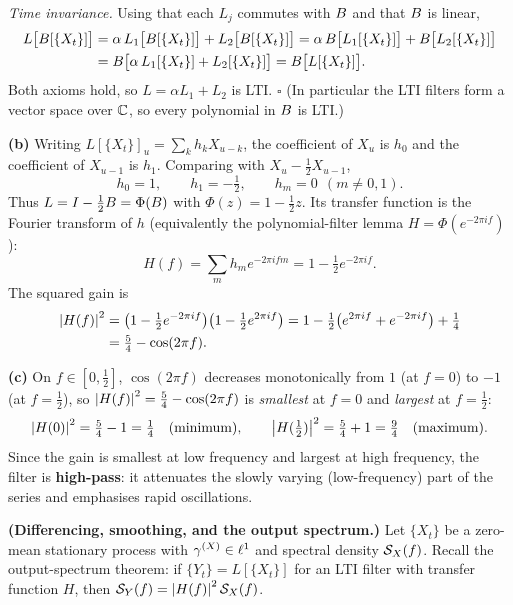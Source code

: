 \documentclass[11pt]{article}
\newcommand{\filt}{L}
\begin{document}
\emph{Time invariance.} Using that each $\filt_j$ commutes with $B$ and that $B$ is linear,
\[
\begin{aligned}
\filt\bigl[\Bsh[\{X_t\}]\bigr]
&=\alpha\,\filt_1\bigl[\Bsh[\{X_t\}]\bigr]+\filt_2\bigl[\Bsh[\{X_t\}]\bigr]
 =\alpha\,\Bsh\bigl[\filt_1[\{X_t\}]\bigr]+\Bsh\bigl[\filt_2[\{X_t\}]\bigr]\\
&=\Bsh\bigl[\alpha\,\filt_1[\{X_t\}]+\filt_2[\{X_t\}]\bigr]
 =\Bsh\bigl[\filt[\{X_t\}]\bigr].
\end{aligned}
\]
Both axioms hold, so $\filt=\alpha\filt_1+\filt_2$ is LTI. \hfill$\square$ (In particular the LTI filters form a vector space over $\mathbb{C}$, so every polynomial in $B$ is LTI.)

\textbf{(b)} Writing $\filt[\{X_t\}]_u=\sum_k h_k X_{u-k}$, the coefficient of $X_u$ is $h_0$ and the coefficient of $X_{u-1}$ is $h_1$. Comparing with $X_u-\tfrac12 X_{u-1}$,
\[
h_0=1,\qquad h_1=-\tfrac12,\qquad h_m=0\ \ (m\neq0,1).
\]
Thus $\filt=I-\tfrac12\Bsh=\Phi(\Bsh)$ with $\Phi(z)=1-\tfrac12 z$. Its transfer function is the Fourier transform of $h$ (equivalently the polynomial-filter lemma $H=\Phi(e^{-2\pi i f})$):
\[
H(f)=\sum_m h_m e^{-2\pi i fm}=1-\tfrac12 e^{-2\pi i f}.
\]
The squared gain is
\[
\begin{aligned}
\left\lvert H(f) \right\rvert^2
&=\bigl(1-\tfrac12 e^{-2\pi i f}\bigr)\bigl(1-\tfrac12 e^{2\pi i f}\bigr)
 =1-\tfrac12\bigl(e^{2\pi i f}+e^{-2\pi i f}\bigr)+\tfrac14\\
&=\tfrac54-\cos(2\pi f).
\end{aligned}
\]

\textbf{(c)} On $f\in[0,\tfrac12]$, $\cos(2\pi f)$ decreases monotonically from $1$ (at $f=0$) to $-1$ (at $f=\tfrac12$), so $\left\lvert H(f) \right\rvert^2=\tfrac54-\cos(2\pi f)$ is \emph{smallest} at $f=0$ and \emph{largest} at $f=\tfrac12$:
\[
\left\lvert H(0) \right\rvert^2=\tfrac54-1=\tfrac14\quad(\text{minimum}),\qquad
\left\lvert H(\tfrac12) \right\rvert^2=\tfrac54+1=\tfrac94\quad(\text{maximum}).
\]
Since the gain is smallest at low frequency and largest at high frequency, the filter is \textbf{high-pass}: it attenuates the slowly varying (low-frequency) part of the series and emphasises rapid oscillations.

\statementstart
\textbf{(Differencing, smoothing, and the output spectrum.)} Let $\{X_t\}$ be a zero-mean stationary process with $\gamma^{(X)}\in\ell^1$ and spectral density $\mathcal{S}_X(f)$. Recall the output-spectrum theorem: if $\{Y_t\}=\filt[\{X_t\}]$ for an LTI filter with transfer function $H$, then $\mathcal{S}_Y(f)=\left\lvert H(f) \right\rvert^2\mathcal{S}_X(f)$.
\end{document}
